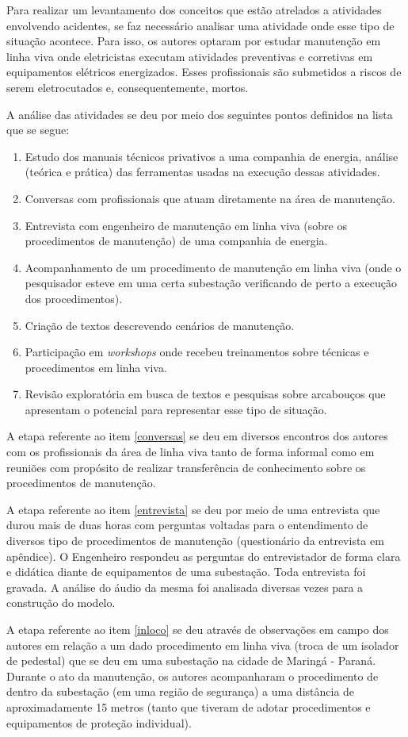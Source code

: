 Para realizar um levantamento dos conceitos que estão atrelados a atividades envolvendo acidentes, se faz necessário analisar uma atividade onde esse tipo de situação acontece. Para isso, os autores optaram por estudar manutenção em linha viva onde eletricistas executam atividades preventivas e corretivas em equipamentos elétricos energizados. Esses profissionais são submetidos a riscos de serem eletrocutados e, consequentemente, mortos. 

A análise das atividades se deu por meio dos seguintes pontos definidos na lista que se segue: 
\begin{enumerate}
	\item Estudo dos manuais técnicos privativos a uma companhia de energia, análise (teórica e prática) das ferramentas usadas na execução dessas atividades. \label{estudosprivativos}
	\item Conversas com profissionais que atuam diretamente na área de manutenção. \label{conversas}
	\item Entrevista com engenheiro de manutenção em linha viva (sobre os procedimentos de manutenção) de uma companhia de energia. \label{entrevista}
	\item Acompanhamento de um procedimento de manutenção em linha viva (onde o pesquisador esteve em uma certa subestação verificando de perto a execução dos procedimentos). \label{inloco}
	\item Criação de textos descrevendo cenários de manutenção.
	\item Participação em \textit{workshops} onde recebeu treinamentos sobre técnicas e procedimentos em linha viva.
	\item Revisão exploratória em busca de textos e pesquisas sobre arcabouços que apresentam o potencial para representar esse tipo de situação.
\end{enumerate}

A etapa referente ao item \ref{conversas} se deu em diversos encontros dos autores com os profissionais da área de linha viva tanto de forma informal como em reuniões com propósito de realizar transferência de conhecimento sobre os procedimentos de manutenção. 

A etapa referente ao item \ref{entrevista} se deu por meio de uma entrevista que durou mais de duas horas com perguntas voltadas para o entendimento de diversos tipo de procedimentos de manutenção (questionário da entrevista em apêndice). O Engenheiro respondeu as perguntas do entrevistador de forma clara e didática diante de equipamentos de uma subestação. Toda entrevista foi gravada. A análise do áudio da mesma foi analisada diversas vezes para a construção do modelo.  

A etapa referente ao item \ref{inloco} se deu através de observações em campo dos autores em relação a um dado procedimento em linha viva (troca de um isolador de pedestal) que se deu em uma subestação na cidade de Maringá - Paraná. Durante o ato da manutenção, os autores acompanharam o procedimento de dentro da subestação (em uma região de segurança) a uma distância de aproximadamente 15 metros (tanto que tiveram de adotar procedimentos e equipamentos de proteção individual).   